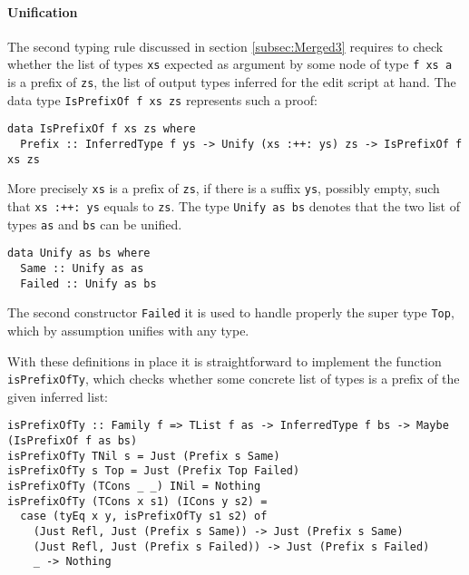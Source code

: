 \documentclass[../Thesis.tex]{subfiles}
\begin{document}
	\paragraph{Unification}
	The second typing rule discussed in section 
	\ref{subsec:Merged3} requires to check whether the list of types \texttt{xs} 
	expected as argument by some node of type \texttt{f xs a} is a prefix of 
	\texttt{zs}, the list of output types inferred for the edit script at hand.
	The data type \texttt{IsPrefixOf f xs zs} represents such a proof:

\begin{verbatim}
data IsPrefixOf f xs zs where
  Prefix :: InferredType f ys -> Unify (xs :++: ys) zs -> IsPrefixOf f xs zs
\end{verbatim}

	More precisely \texttt{xs} is a prefix of \texttt{zs}, if there is a suffix 
	\texttt{ys}, possibly empty, such that \texttt{xs :++: ys} equals to 
	\texttt{zs}.
	The type \texttt{Unify as bs}  denotes that the two list of types 
	\texttt{as} and \texttt{bs} can be unified.

\begin{verbatim}
data Unify as bs where
  Same :: Unify as as
  Failed :: Unify as bs
\end{verbatim}

	The second constructor \texttt{Failed} it is used to handle properly the 
	super type \texttt{Top}, which by assumption unifies with any type.
	
	With these definitions in place it is straightforward to implement
	the function \texttt{isPrefixOfTy}, which checks whether some 
	concrete list of types is a prefix of the given inferred list:
	
\begin{verbatim}
isPrefixOfTy :: Family f => TList f as -> InferredType f bs -> Maybe (IsPrefixOf f as bs)
isPrefixOfTy TNil s = Just (Prefix s Same)
isPrefixOfTy s Top = Just (Prefix Top Failed)
isPrefixOfTy (TCons _ _) INil = Nothing
isPrefixOfTy (TCons x s1) (ICons y s2) =
  case (tyEq x y, isPrefixOfTy s1 s2) of
    (Just Refl, Just (Prefix s Same)) -> Just (Prefix s Same)
    (Just Refl, Just (Prefix s Failed)) -> Just (Prefix s Failed)
    _ -> Nothing
\end{verbatim}
	
\end{document}
